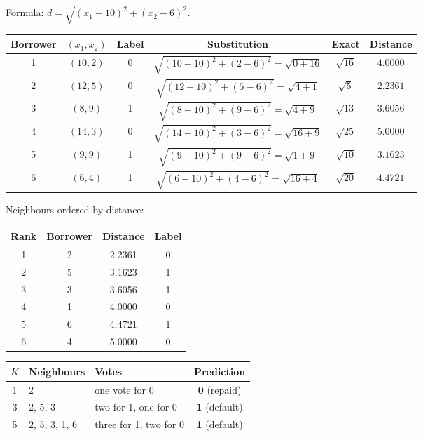 Formula: $d = \sqrt{(x_1 - 10)^2 + (x_2 - 6)^2}$.

\begin{table}[H]\centering\small
\begin{tabular}{cccccc}\toprule
Borrower & $(x_1, x_2)$ & Label & Substitution & Exact & Distance\\\midrule
1 & $(10, 2)$ & 0 & $\sqrt{(10-10)^2 + (2-6)^2} = \sqrt{0+16}$ & $\sqrt{16}$ & $4.0000$\\
2 & $(12, 5)$ & 0 & $\sqrt{(12-10)^2 + (5-6)^2} = \sqrt{4+1}$  & $\sqrt{5}$  & $2.2361$\\
3 & $(8, 9)$  & 1 & $\sqrt{(8-10)^2 + (9-6)^2}  = \sqrt{4+9}$  & $\sqrt{13}$ & $3.6056$\\
4 & $(14, 3)$ & 0 & $\sqrt{(14-10)^2 + (3-6)^2} = \sqrt{16+9}$ & $\sqrt{25}$ & $5.0000$\\
5 & $(9, 9)$  & 1 & $\sqrt{(9-10)^2 + (9-6)^2}  = \sqrt{1+9}$  & $\sqrt{10}$ & $3.1623$\\
6 & $(6, 4)$  & 1 & $\sqrt{(6-10)^2 + (4-6)^2}  = \sqrt{16+4}$ & $\sqrt{20}$ & $4.4721$\\\bottomrule
\end{tabular}\end{table}

Neighbours ordered by distance:

\begin{table}[H]\centering\small
\begin{tabular}{cccc}\toprule
Rank & Borrower & Distance & Label\\\midrule
1 & 2 & 2.2361 & 0\\ 2 & 5 & 3.1623 & 1\\ 3 & 3 & 3.6056 & 1\\
4 & 1 & 4.0000 & 0\\ 5 & 6 & 4.4721 & 1\\ 6 & 4 & 5.0000 & 0\\\bottomrule
\end{tabular}\end{table}

\begin{table}[H]\centering\small
\begin{tabular}{cllc}\toprule
$K$ & Neighbours & Votes & Prediction\\\midrule
1 & 2 & one vote for 0 & \textbf{0} (repaid)\\
3 & 2, 5, 3 & two for 1, one for 0 & \textbf{1} (default)\\
5 & 2, 5, 3, 1, 6 & three for 1, two for 0 & \textbf{1} (default)\\\bottomrule
\end{tabular}\end{table}

